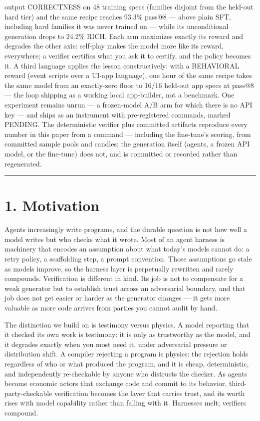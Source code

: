 \documentclass[11pt]{article}
\begin{document}
output CORRECTNESS on 48 training specs (families disjoint from the held-out
hard tier) and the same recipe reaches 93.3\% pass@8 --- above plain SFT,
including hard families it was never trained on --- while its unconditional
generation drops to 24.2\% RICH. Each arm maximizes exactly its reward and
degrades the other axis: self-play makes the model more like its reward,
everywhere; a verifier certifies what you ask it to certify, and the policy
becomes it. A third language applies the lesson constructively: with a
BEHAVIORAL reward (event scripts over a UI-app language), one hour of the
same recipe takes the same model from an exactly-zero floor to 16/16
held-out app specs at pass@8 --- the loop shipping as a working local
app-builder, not a benchmark.
One experiment remains unrun --- a frozen-model A/B arm for which there is no API
key --- and ships as an instrument with pre-registered commands, marked PENDING.
The deterministic verifier plus committed artifacts reproduce every number in
this paper from a command --- including the fine-tune's scoring, from committed
sample pools and candles; the generation itself (agents, a frozen API model, or
the fine-tune) does not, and is committed or recorded rather than regenerated.

\bigskip\hrule\bigskip

\section*{1. Motivation}

Agents increasingly write programs, and the durable question is not how well a
model writes but who checks what it wrote. Most of an agent harness is
machinery that encodes an assumption about what today's models cannot do: a
retry policy, a scaffolding step, a prompt convention. Those assumptions go
stale as models improve, so the harness layer is perpetually rewritten and
rarely compounds. Verification is different in kind. Its job is not to
compensate for a weak generator but to establish trust across an adversarial
boundary, and that job does not get easier or harder as the generator changes ---
it gets more valuable as more code arrives from parties you cannot audit by
hand.

The distinction we build on is testimony versus physics. A model reporting that
it checked its own work is testimony: it is only as trustworthy as the model,
and it degrades exactly when you most need it, under adversarial pressure or
distribution shift. A compiler rejecting a program is physics: the rejection
holds regardless of who or what produced the program, and it is cheap,
deterministic, and independently re-checkable by anyone who distrusts the
checker. As agents become economic actors that exchange code and commit to its
behavior, third-party-checkable verification becomes the layer that carries
trust, and its worth rises with model capability rather than falling with it.
Harnesses melt; verifiers compound.
\end{document}

